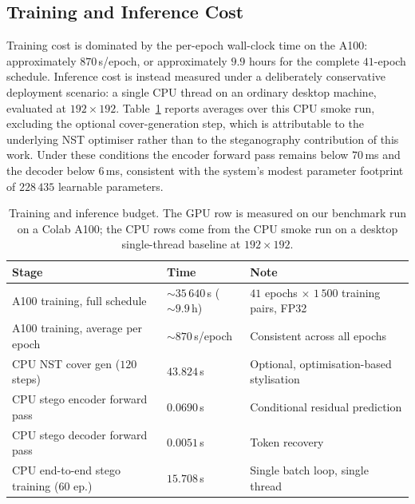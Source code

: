 \documentclass[runningheads]{llncs}
\begin{document}
\subsection{Training and Inference Cost}
\label{sec:inference}
Training cost is dominated by the per-epoch wall-clock time on the A100: approximately $870$\,s/epoch, or approximately $9.9$ hours for the complete $41$-epoch schedule. Inference cost is instead measured under a deliberately conservative deployment scenario: a single CPU thread on an ordinary desktop machine, evaluated at $192\!\times\!192$. Table~\ref{tab:inference} reports averages over this CPU smoke run, excluding the optional cover-generation step, which is attributable to the underlying NST optimiser rather than to the steganography contribution of this work. Under these conditions the encoder forward pass remains below $70$\,ms and the decoder below $6$\,ms, consistent with the system's modest parameter footprint of $228\,435$ learnable parameters.

\begin{table}[t]
\centering
\caption{Training and inference budget. The GPU row is measured on our benchmark run on a Colab A100; the CPU rows come from the CPU smoke run on a desktop single-thread baseline at $192\!\times\!192$.}
\label{tab:inference}
\setlength{\tabcolsep}{5pt}
\footnotesize
\begin{tabular}{@{}p{}p{}p{}@{}}
\toprule
\textbf{Stage} & \textbf{Time} & \textbf{Note} \\
\midrule
A100 training, full schedule        & $\sim\!35\,640$\,s ($\sim\!9.9$\,h) & $41$ epochs $\times$ $1\,500$ training pairs, FP32 \\
A100 training, average per epoch    & $\sim\!870$\,s/epoch       & Consistent across all epochs \\
\midrule
CPU NST cover gen ($120$ steps)         & $43.824$\,s          & Optional, optimisation-based stylisation \\
CPU stego encoder forward pass          & $0.0690$\,s          & Conditional residual prediction \\
CPU stego decoder forward pass          & $0.0051$\,s          & Token recovery \\
CPU end-to-end stego training ($60$ ep.)& $15.708$\,s          & Single batch loop, single thread \\
\bottomrule
\end{tabular}
\end{table}
\end{document}
